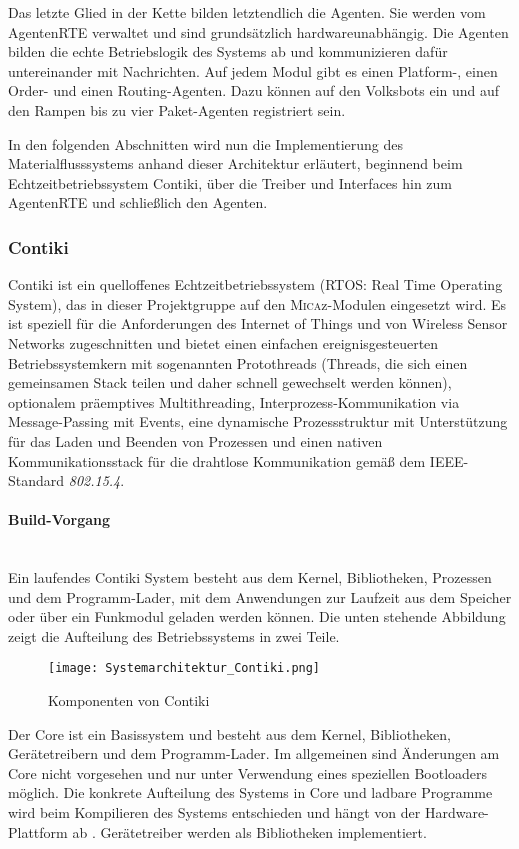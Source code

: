 Das letzte Glied in der Kette bilden letztendlich die Agenten. Sie werden vom AgentenRTE verwaltet und sind grundsätzlich hardwareunabhängig. Die Agenten bilden die echte Betriebslogik des Systems ab und kommunizieren dafür untereinander mit Nachrichten. Auf jedem Modul gibt es einen Platform-, einen Order- und einen Routing-Agenten. Dazu können auf den Volksbots ein und auf den Rampen bis zu vier Paket-Agenten registriert sein.

In den folgenden Abschnitten wird nun die Implementierung des Materialflusssystems anhand dieser Architektur erläutert, beginnend beim Echtzeitbetriebssystem Contiki, über die Treiber und Interfaces hin zum AgentenRTE und schließlich den Agenten.

\subsubsection{Contiki}
Contiki ist ein quelloffenes Echtzeitbetriebssystem (RTOS: Real Time Operating System), das in dieser Projektgruppe auf den \textsc{Mica}z-Modulen eingesetzt wird. Es ist speziell für die Anforderungen des Internet of Things und von Wireless Sensor Networks zugeschnitten und bietet einen einfachen ereignisgesteuerten Betriebssystemkern mit sogenannten Protothreads (Threads, die sich einen gemeinsamen Stack teilen und daher schnell gewechselt werden können), optionalem präemptives Multithreading, Interprozess-Kommunikation via Message-Passing mit Events, eine dynamische Prozessstruktur mit Unterstützung für das Laden und Beenden von Prozessen und einen nativen Kommunikationsstack für die drahtlose Kommunikation gemäß dem IEEE-Standard \textit{802.15.4}.
 
\paragraph{Build-Vorgang}\mbox{}\\
Ein laufendes Contiki System besteht aus dem Kernel, Bibliotheken, Prozessen und dem Programm-Lader, mit dem Anwendungen zur Laufzeit aus dem Speicher oder \"uber ein Funkmodul geladen werden k\"onnen.
Die unten stehende Abbildung zeigt die Aufteilung des Betriebssystems in zwei Teile. 
\begin{figure}[h!]
	\centering
		\texttt{[image: Systemarchitektur\_Contiki.png]}
	\caption{Komponenten von Contiki \cite{Dunkels:Groenvall:Voigt:2014:Online}}
	\label{Systemarchitektur von Contiki}
\end{figure}
Der Core ist ein Basissystem und besteht aus dem Kernel, Bibliotheken, Ger\"{a}tetreibern und dem Programm-Lader. 
Im allgemeinen sind \"Anderungen am Core nicht vorgesehen und nur unter Verwendung eines speziellen Bootloaders m\"oglich. 
Die konkrete Aufteilung des Systems in Core und ladbare Programme wird beim Kompilieren des Systems entschieden und h\"angt 
von der Hardware-Plattform ab \cite[vgl.][S. 7]{Walter:2010}. Ger\"atetreiber werden als Bibliotheken implementiert. 

